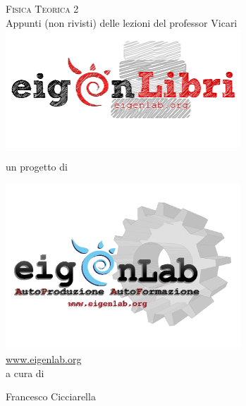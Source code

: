 \documentclass[12pt,a4paper]{article}
\theoremstyle{definition}
\numberwithin{equation}{section}
\begin{document}
\begin{titlepage}
\centering
{\Huge \scshape{Fisica Teorica 2}}\\
\vspace*{0.5cm}
{\small Appunti (non rivisti) delle lezioni del professor Vicari}
 \\
\includegraphics[width=250pt,keepaspectratio=true]{Addons/eigenLibrichiaro}
\begin{center}
un progetto di
\end{center}
\includegraphics[width=250pt,keepaspectratio=true]{Addons/eigenlabinvertito2.png} \\
\url{www.eigenlab.org}
 \\
{\small a cura di}\\
\vspace*{0.5cm}
{\normalsize Francesco Cicciarella\par}
\end{titlepage}
\pagebreak
{}
\end{document}
